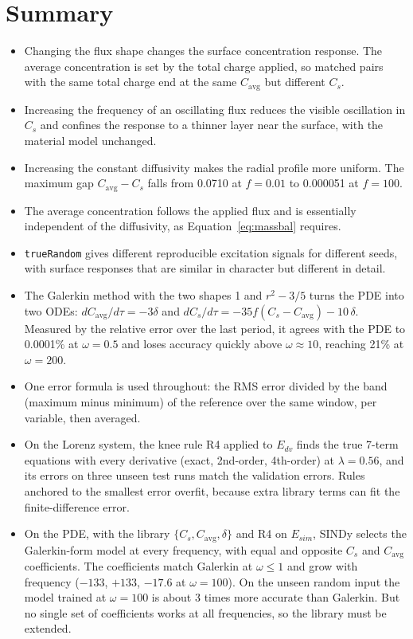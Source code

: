\documentclass[11pt,a4paper]{article}
\newcommand{\avg}{\mathrm{avg}}
\begin{document}
\section{Summary}
\begin{itemize}
  \item Changing the flux shape changes the surface concentration response. The average concentration is set by the total charge applied, so matched pairs with the same total charge end at the same $C_\avg$ but different $C_s$.
  \item Increasing the frequency of an oscillating flux reduces the visible oscillation in $C_s$ and confines the response to a thinner layer near the surface, with the material model unchanged.
  \item Increasing the constant diffusivity makes the radial profile more uniform. The maximum gap $C_\avg-C_s$ falls from 0.0710 at $f=0.01$ to 0.000051 at $f=100$.
  \item The average concentration follows the applied flux and is essentially independent of the diffusivity, as Equation~\eqref{eq:massbal} requires.
  \item \texttt{trueRandom} gives different reproducible excitation signals for different seeds, with surface responses that are similar in character but different in detail.
  \item The Galerkin method with the two shapes 1 and $r^2-3/5$ turns the PDE into two ODEs: $dC_\avg/d\tau=-3\delta$ and $dC_s/d\tau=-35f(C_s-C_\avg)-10\,\delta$. Measured by the relative error over the last period, it agrees with the PDE to 0.0001\% at $\omega=0.5$ and loses accuracy quickly above $\omega\approx10$, reaching 21\% at $\omega=200$.
  \item One error formula is used throughout: the RMS error divided by the band (maximum minus minimum) of the reference over the same window, per variable, then averaged.
  \item On the Lorenz system, the knee rule R4 applied to $E_{dv}$ finds the true 7-term equations with every derivative (exact, 2nd-order, 4th-order) at $\lambda=0.56$, and its errors on three unseen test runs match the validation errors. Rules anchored to the smallest error overfit, because extra library terms can fit the finite-difference error.
  \item On the PDE, with the library $\{C_s,C_\avg,\delta\}$ and R4 on $E_{sim}$, SINDy selects the Galerkin-form model at every frequency, with equal and opposite $C_s$ and $C_\avg$ coefficients. The coefficients match Galerkin at $\omega\le1$ and grow with frequency ($-133$, $+133$, $-17.6$ at $\omega=100$). On the unseen random input the model trained at $\omega=100$ is about 3 times more accurate than Galerkin. But no single set of coefficients works at all frequencies, so the library must be extended.
\end{itemize}
\end{document}

